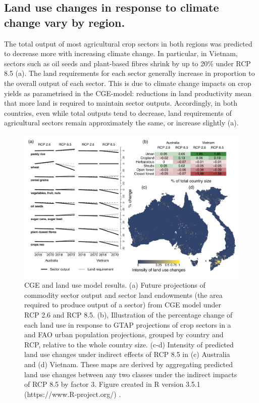 \subsection{Land use changes in response to climate change vary by region.}
The total output of most agricultural crop sectors in both regions was predicted to decrease more with increasing climate change. In particular, in Vietnam, sectors such as oil seeds and plant-based fibres shrink by up to 20\% under RCP 8.5 (a). The land requirements for each sector generally increase in proportion to the overall output of each sector. This is due to climate change impacts on crop yields as parametrised in the CGE-model: reductions in land productivity mean that more land is required to maintain sector outputs. Accordingly, in both countries, even while total outputs tend to decrease, land requirements of agricultural sectors remain approximately the same, or increase slightly (a).

\begin{figure}[htb]
  \centering
  \includegraphics[width=\textwidth]{chapters/figures/chapter2/fig3.pdf}
  \caption{CGE and land use model results. (a) Future projections of commodity sector output and sector land endowments (the area required to produce output of a sector) from CGE model under RCP 2.6 and RCP 8.5. (b), Illustration of the percentage change of each land use in response to GTAP projections of crop sectors in a and FAO urban population projections, grouped by country and RCP, relative to the whole country size. (c-d) Intensity of predicted land use changes under indirect effects of RCP 8.5 in (c) Australia and (d) Vietnam. These maps are derived by aggregating predicted land use changes between any two classes under the indirect impacts of RCP 8.5 by factor 3.  Figure created in R version 3.5.1 (https://www.R-project.org/) \citep{r_development_core_team_r_2008}.}
  \label{ch2:fig3}
\end{figure}

